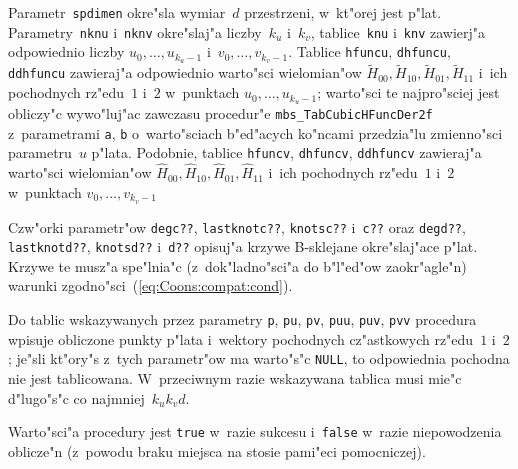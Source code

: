 Parametr~\texttt{spdimen} okre"sla wymiar~$d$ przestrzeni, w~kt"orej jest
p"lat. Pa\-ra\-met\-ry~\texttt{nknu} i~\texttt{nknv} okre"slaj"a liczby~$k_u$
i~$k_v$, tablice~\texttt{knu} i~\texttt{knv}
zawierj"a odpowiednio liczby $u_0,\ldots,u_{k_u-1}$ i~$v_0,\ldots,v_{k_v-1}$.
Tablice \texttt{hfuncu}, \texttt{dhfuncu},
\texttt{ddhfuncu} zawieraj"a odpowiednio warto"sci wielomian"ow
$\tilde{H}_{00},\tilde{H}_{10},\tilde{H}_{01},\tilde{H}_{11}$
i~ich pochodnych rz"edu~$1$ i~$2$ w~punktach
$u_0,\ldots,u_{k_u-1}$; warto"sci te najpro"sciej jest obliczy"c
wywo"luj"ac zawczasu procedur"e \texttt{mbs\_TabCubicHFuncDer2f}
z~parametrami \texttt{a}, \texttt{b} o~warto"sciach b"ed"acych ko"ncami
przedzia"lu zmienno"sci parametru~$u$ p"lata. Podobnie, tablice
\texttt{hfuncv}, \texttt{dhfuncv}, \texttt{ddhfuncv} zawieraj"a
warto"sci wielomian"ow $\hat{H}_{00},\hat{H}_{10},\hat{H}_{01},\hat{H}_{11}$  
i~ich pochodnych rz"edu~$1$ i~$2$ w~punktach $v_0,\ldots,v_{k_v-1}$

Czw"orki parametr"ow \texttt{degc??}, \texttt{lastknotc??}, \texttt{knotsc??}
i~\texttt{c??} oraz \texttt{degd??}, \texttt{lastknotd??}, \texttt{knotsd??}
i~\texttt{d??} opisuj"a krzywe B-sklejane okre"slaj"ace p"lat.
Krzywe te musz"a spe"lnia"c (z~dok"ladno"sci"a do b"l"ed"ow zaokr"agle"n)
warunki zgodno"sci~(\ref{eq:Coons:compat:cond}).

Do tablic wskazywanych przez parametry \texttt{p}, \texttt{pu}, \texttt{pv},
\texttt{puu}, \texttt{puv}, \texttt{pvv} procedura wpisuje obliczone punkty
p"lata i~wektory pochodnych cz"astkowych rz"edu~$1$ i~$2$; je"sli kt"ory"s
z~tych parametr"ow ma warto"s"c \texttt{NULL}, to odpowiednia pochodna
nie jest tablicowana. W~przeciwnym razie wskazywana tablica musi mie"c
d"lugo"s"c co najmniej~$k_uk_vd$.

Warto"sci"a procedury jest \texttt{true} w~razie sukcesu i~\texttt{false}
w~razie niepowodzenia oblicze"n (z~powodu braku miejsca na stosie
pami"eci pomocniczej).


